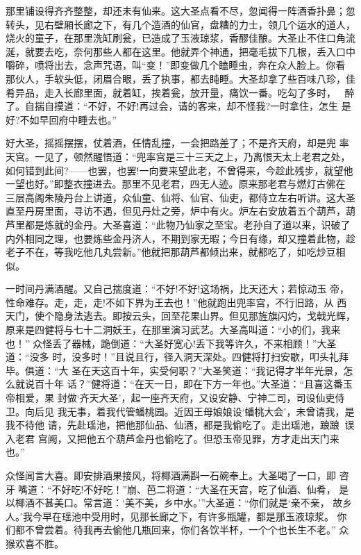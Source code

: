 那里铺设得齐齐整整，却还未有仙来。这大圣点看不尽，忽闻得一阵酒香扑鼻；忽
转头，见右壁厢长廊之下，有几个造酒的仙官，盘糟的力士，领几个运水的道人，
烧火的童子，在那里洗缸刷瓮，已造成了玉液琼浆，香醪佳酿。大圣止不住口角流
涎，就要去吃，奈何那些人都在这里。他就弄个神通，把毫毛拔下几根，丢入口中
嚼碎，喷将出去，念声咒语，叫“变！”即变做几个瞌睡虫，奔在众人脸上。你看
那伙人，手软头低，闭眉合眼，丢了执事，都去盹睡。大圣却拿了些百味八珍，佳
肴异品，走入长廊里面，就着缸，挨着瓮，放开量，痛饮一番。吃勾了多时，
醉了。自揣自摸道：“不好，不好!再过会，请的客来，却不怪我?一时拿住，怎生
是好?不如早回府中睡去也。”

好大圣，摇摇摆摆，仗着酒，任情乱撞，一会把路差了；不是齐天府，却是兜
率天宫。一见了，顿然醒悟道：“兜率宫是三十三天之上，乃离恨天太上老君之处，
如何错到此间?——也罢，也罢!一向要来望此老，不曾得来，今趁此残步，就望他
一望也好。”即整衣撞进去。那里不见老君，四无人迹。原来那老君与燃灯古佛在
三层高阁朱陵丹台上讲道，众仙童、仙将、仙官、仙吏，都侍立左右听讲。这大圣
直至丹房里面，寻访不遇，但见丹灶之旁，炉中有火。炉左右安放着五个葫芦，葫
芦里都是炼就的金丹。大圣喜道：“此物乃仙家之至宝。老孙自了道以来，识破了
内外相同之理，也要炼些金丹济人，不期到家无暇；今日有缘，却又撞着此物，趁
老子不在，等我吃他几丸尝新。”他就把那葫芦都倾出来，就都吃了，如吃炒豆相
似。

一时间丹满酒醒。又自己揣度道：“不好!不好!这场祸，比天还大；若惊动玉
帝，性命难存。走，走，走!不如下界为王去也！”他就跑出兜率宫，不行旧路，从
西天门，使个隐身法逃去。即按云头，回至花果山界。但见那旌旗闪灼，戈戟光辉，
原来是四健将与七十二洞妖王，在那里演习武艺。大圣高叫道：“小的们，我来也！”
众怪丢了器械，跪倒道：“大圣好宽心!丢下我等许久，不来相顾！”大圣道：“没多
时，没多时！”且说且行，径入洞天深处。四健将打扫安歇，叩头礼拜毕。俱道：“大
圣在天这百十年，实受何职？”大圣笑道：“我记得才半年光景，怎么就说百十年
话？”健将道：“在天一日，即在下方一年也。”大圣道：“且喜这番玉帝相爱，果
封做‘齐天大圣’，起一座齐天府，又设安静、宁神二司，司设仙吏侍卫。向后见
我无事，着我代管蟠桃园。近因王母娘娘设‘蟠桃大会’，未曾请我，是我不待他
请，先赴瑶池，把他那仙品、仙酒，都是我偷吃了。走出瑶池，踉踉误入老君
宫阙，又把他五个葫芦金丹也偷吃了。但恐玉帝见罪，方才走出天门来也。”

众怪闻言大喜。即安排酒果接风，将椰酒满斟一石碗奉上。大圣喝了一口，即
咨牙嘴道：“不好吃!不好吃！”崩、芭二将道：“大圣在天宫，吃了仙酒、仙肴，
是以椰酒不甚美口。常言道：‘美不美，乡中水。’”大圣道：“你们就是‘亲不亲，
故乡人。’我今早在瑶池中受用时，见那长廊之下，有许多瓶罐，都是那玉液琼浆。
你们都不曾尝着。待我再去偷他几瓶回来，你们各饮半杯，一个个也长生不老。”
众猴欢喜不胜。

